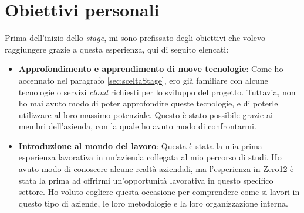 \section{Obiettivi personali}
Prima dell'inizio dello \textit{stage}, mi sono prefissato degli obiettivi che volevo raggiungere grazie a questa esperienza, qui di seguito elencati:
\begin{itemize}
    \item \textbf{Approfondimento e apprendimento di nuove tecnologie}: Come ho accennato nel paragrafo \ref{sec:sceltaStage}, ero già familiare con alcune tecnologie o servizi \textit{cloud} richiesti per lo sviluppo del progetto. Tuttavia, non ho mai avuto modo di poter approfondire queste tecnologie, e di poterle utilizzare al loro massimo potenziale. Questo è stato possibile grazie ai membri dell'azienda, con la quale ho avuto modo di confrontarmi.
    \item \textbf{Introduzione al mondo del lavoro}: Questa è stata la mia prima esperienza lavorativa in un'azienda collegata al mio percorso di studi. Ho avuto modo di conoscere alcune realtà aziendali, ma l'esperienza in Zero12 è stata la prima ad offrirmi un'opportunità lavorativa in questo specifico settore. Ho voluto cogliere questa occasione per comprendere come si lavori in questo tipo di aziende, le loro metodologie e la loro organizzazione interna. 
\end{itemize}
